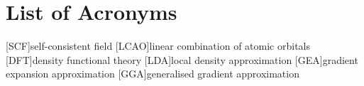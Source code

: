 
\chapter*{List of Acronyms}

\begin{acronym}[ABCDEFGHIJK]
    [SCF]{self-consistent field}
    [LCAO]{linear combination of atomic orbitals}
    [DFT]{density functional theory}
    [LDA]{local density approximation}
	[GEA]{gradient expansion approximation}
	[GGA]{generalised gradient approximation}
\end{acronym}
